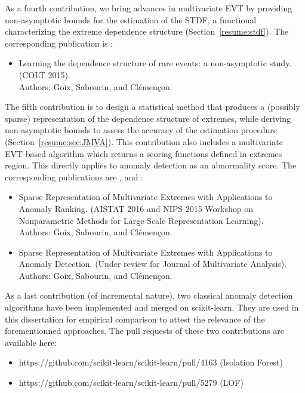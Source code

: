 As a fourth contribution, we bring advances in multivariate EVT by providing non-asymptotic bounds for the estimation of the STDF, a functional characterizing the extreme dependence structure (Section~\ref{resume:stdf}). The corresponding publication is \cite{COLT15}:
\begin{itemize}
\item Learning the dependence structure of rare events: a non-asymptotic study. (COLT 2015).\\
Authors: Goix, Sabourin, and Clémençon.
\end{itemize}

The fifth contribution is to design a statistical method that produces a (possibly sparse) representation of the dependence structure of extremes, while deriving non-asymptotic bounds to assess the accuracy of the estimation procedure (Section~\ref{resume:sec:JMVA}).
%
This contribution also includes a multivariate EVT-based algorithm which returns a scoring functions defined in extremes region. This directly applies to anomaly detection as an abnormality score.
The corresponding publications are \cite{AISTAT16}, \cite{NIPSWORKSHOP15} and \cite{ARXIV16}:
%
\begin{itemize}
\item Sparse Representation of Multivariate Extremes with Applications to Anomaly Ranking. (AISTAT 2016 and NIPS 2015 Workshop on Nonparametric Methods for Large Scale Representation Learning).\\
Authors: Goix, Sabourin, and Clémençon.
\item Sparse Representation of Multivariate Extremes with Applications to Anomaly Detection. (Under review for Journal of Multivariate Analysis).\\
Authors: Goix, Sabourin, and Clémençon.
\end{itemize}


As a last contribution (of incremental nature), two classical anomaly detection algorithms have been implemented and merged on scikit-learn. They are used in this dissertation for empirical comparison to attest the relevance of the forementionned approaches.
The pull requests of these two contributions are available here:
\begin{itemize}
\item https://github.com/scikit-learn/scikit-learn/pull/4163  (Isolation Forest)
\item https://github.com/scikit-learn/scikit-learn/pull/5279 (LOF)
\end{itemize}


